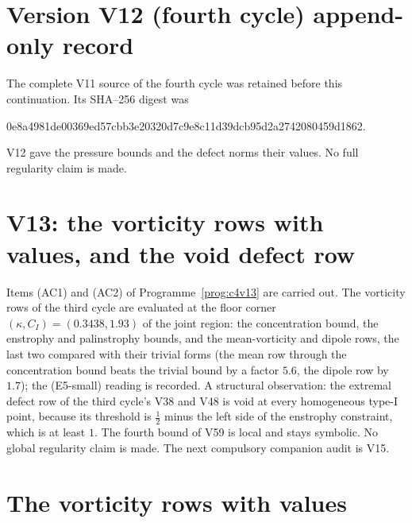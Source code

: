 \documentclass[11pt]{article}
\theoremstyle{plain}
\theoremstyle{definition}
\theoremstyle{remark}
\begin{document}
\section*{Version V12 (fourth cycle) append-only record}

The complete V11 source of the fourth cycle was retained before this
continuation.  Its SHA--256 digest was
\begin{center}\scriptsize\ttfamily
0e8a4981de00369ed57cbb3e20320d7c9e8c11d39dcb95d2a2742080459d1862.
\end{center}
V12 gave the pressure bounds and the defect norms their values.  No
full regularity claim is made.

\section{V13: the vorticity rows with values, and the void defect row}
\label{sec:c4v13-entry}

Items (AC1) and (AC2) of Programme~\ref{prog:c4v13} are carried out.
The vorticity rows of the third cycle are evaluated at the floor
corner \((\kappa,C_I)=(0.3438,1.93)\) of the joint region: the concentration
bound, the enstrophy and palinstrophy bounds, and the
mean-vorticity and dipole rows, the last two compared with their
trivial forms (the mean row through the concentration bound beats
the trivial bound by a factor \(5.6\), the dipole row by \(1.7\)); the
(E5-small) reading is recorded.  A structural observation: the
extremal defect row of the third cycle's V38 and V48 is void at every
homogeneous type-I point, because its threshold is \(\frac12\) minus the
left side of the enstrophy constraint, which is at least \(1\).  The
fourth bound of V59 is local and stays symbolic.  No global regularity
claim is made.  The next compulsory companion audit is V15.

\section{The vorticity rows with values}
\label{sec:c4v13-rows}
\end{document}
